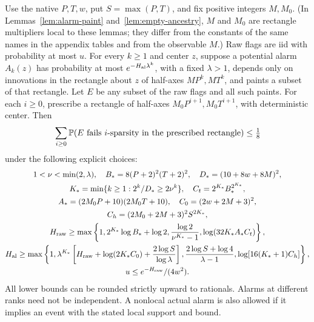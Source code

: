 \begin{lemma}\label{lem:alarm-paint}
Use the native \(P,T,w\), put \(S=\max(P,T)\), and fix positive integers \(M,M_0\). (In Lemmas~\ref{lem:alarm-paint} and~\ref{lem:empty-ancestry}, \(M\) and \(M_0\) are rectangle multipliers local to these lemmas; they differ from the constants of the same names in the appendix tables and from the observable \(M\).) Raw flags are iid with probability at most \(u\). For every \(k\ge1\) and center \(z\), suppose a potential alarm \(A_k(z)\) has probability at most \(e^{-H_{\rm al}\lambda^k}\), with a fixed \(\lambda>1\), depends only on innovations in the rectangle about \(z\) of half-axes \(MP^k,MT^k\), and paints a subset of that rectangle. Let \(E\) be any subset of the raw flags and all such paints. For each \(i\ge0\), prescribe a rectangle of half-axes \(M_0P^{i+1},M_0T^{i+1}\), with deterministic center. Then
\[
\sum_{i\ge0}\mathbb P(E\text{ fails }i\text{-sparsity in the prescribed rectangle})\le\tfrac18
\]
under the following explicit choices:
\begin{gather*}
1<\nu<\min(2,\lambda),\quad
B_*=8(P+2)^2(T+2)^2,\quad D_*=(10+8w+8M)^2,\\
K_* =\min\{k\ge1:2^k/D_*\ge2\nu^k\},\quad
C_t=2^{K_*}B_*^{2^{K_*}},\\
A_*=(2M_0P+10)(2M_0T+10),\quad C_0=(2w+2M+3)^2,\\
C_h=(2M_0+2M+3)^2S^{2K_*},\\
H_{\rm raw}\ge\max\left\{1,2^{K_*}\log B_*+\log2,
\frac{\log2}{\nu^{K_*}-1},\log(32K_*A_*C_t)\right\},\\
H_{\rm al}\ge\max\left\{1,\lambda^{K_*}
\left[H_{\rm raw}+\log(2K_*C_0)+\frac{2\log S}{\log\lambda}\right],
\frac{2\log S+\log4}{\lambda-1},\log[16(K_*+1)C_h]\right\},\\
u\le e^{-H_{\rm raw}}/(4w^2).
\end{gather*}
All lower bounds can be rounded strictly upward to rationals. Alarms at different ranks need not be independent. A nonlocal actual alarm is also allowed if it implies an event with the stated local support and bound.
\end{lemma}

